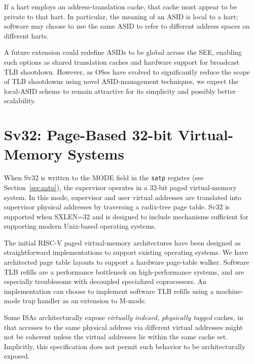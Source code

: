 If a hart employs an address-translation cache, that cache must appear to be
private to that hart.
In particular, the meaning of an ASID is local to a hart; software may choose
to use the same ASID to refer to different address spaces on different harts.

\begin{commentary}
A future extension could redefine ASIDs to be global across the SEE, enabling
such options as shared translation caches and hardware support for broadcast
TLB shootdown.
However, as OSes have evolved to significantly reduce the scope of TLB
shootdowns using novel ASID-management techniques, we expect the local-ASID
scheme to remain attractive for its simplicity and possibly better
scalability.
\end{commentary}

\section{Sv32: Page-Based 32-bit Virtual-Memory Systems}
\label{sec:sv32}

When Sv32 is written to the MODE field in the {\tt satp} register (see
Section~\ref{sec:satp}), the supervisor operates in a 32-bit paged
virtual-memory system.  In this mode, supervisor and user virtual addresses
are translated into supervisor physical addresses by traversing a radix-tree
page table.  Sv32 is supported when SXLEN=32 and is designed to include
mechanisms sufficient for supporting modern Unix-based operating systems.

\begin{commentary}
The initial RISC-V paged virtual-memory architectures have been
designed as straightforward implementations to support existing
operating systems.  We have architected page table layouts to support
a hardware page-table walker.  Software TLB refills are a performance
bottleneck on high-performance systems, and are especially troublesome
with decoupled specialized coprocessors.  An implementation can choose
to implement software TLB refills using a machine-mode trap handler as
an extension to M-mode.
\end{commentary}

\begin{commentary}
Some ISAs architecturally expose \emph{virtually indexed, physically tagged}
caches, in that accesses to the same physical address via different virtual
addresses might not be coherent unless the virtual addresses lie within the
same cache set.
Implicitly, this specification does not permit such behavior to be
architecturally exposed.
\end{commentary}

